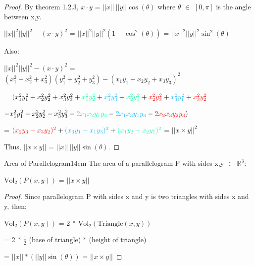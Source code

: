     \begin{proof}
        By {\color{red} theorem 1.2.3},
        $x \cdot y$ = $||x|| \ ||y|| \cos(\theta)$
        where $\theta$ $\in$ $[0,\pi]$ is the angle between x,y.

        \hspace{0.5cm}
        $||x||^2 ||y||^2 - (x \cdot y)^2$
        = $||x||^2 ||y||^2 (1 - \cos^2(\theta))$
        = $||x||^2 ||y||^2 \sin^2(\theta)$

        Also:

        \hspace{0.5cm}
        $||x||^2 ||y||^2 - (x \cdot y)^2$
        = $(x_1^2 + x_2^2 + x_3^2)(y_1^2 + y_2^2 + y_3^2)
            - (x_1y_1 + x_2y_2 + x_3y_3)^2$

        \hspace{0.5cm}
        = $(x_1^2y_1^2 + x_2^2y_2^2 + x_3^2y_3^2
            + {\color{green} x_1^2y_2^2} + {\color{lblue} x_1^2y_3^2}
            + {\color{green} x_2^2y_1^2} + {\color{red} x_2^2y_3^2}
            + {\color{lblue} x_3^2y_1^2} + {\color{red} x_3^2y_2^2}$

            \hspace{1cm}
            $- x_1^2y_1^2 - x_2^2y_2^2 - x_3^2y_3^2
            - {\color{green} 2x_1x_2y_1y_2}
            - {\color{lblue} 2x_1x_3y_1y_3}
            - {\color{red} 2x_2x_3y_2y_3})$

        \hspace{0.5cm}
        = ${\color{red} (x_2y_3 - x_3y_2)^2}
            + {\color{lblue} (x_3y_1 - x_1y_3)^2}
            + {\color{green} (x_1y_2 - x_2y_1)^2}$
        = $||x \times y||^2$

        Thus, $||x \times y||$ = $||x|| \ ||y|| \sin(\theta)$.
    \end{proof}

    \newpage



    \begin{wtheorem}{Area of Parallelogram}{14cm}
        The area of a parallelogram P with sides x,y $\in$ $\mathbb{R}^3$:

        \hspace{0.5cm}
        $\text{Vol}_2(P(x,y))$ = $||x \times y||$
    \end{wtheorem}

    \begin{proof}
        Since parallelogram P with sides x and y is two triangles with
        sides x and y, then:

        \hspace{0.5cm}
        $\text{Vol}_2(P(x,y))$
        = 2 * $\text{Vol}_2(\text{Triangle}(x,y))$
        
        \hspace{3cm}
        = 2 * $\frac{1}{2}$ (base of triangle) * (height of triangle)
      
        \hspace{3cm}
        = $||x|| * (||y||\sin(\theta))$
        = $||x \times y ||$
    \end{proof}

